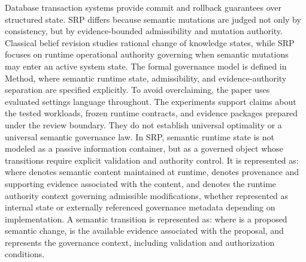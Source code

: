 {}Database transaction systems provide commit and rollback guarantees over structured state. SRP differs because semantic mutations are judged not only by consistency, but by evidence-bounded admissibility and mutation authority. Classical belief revision studies rational change of knowledge states, while SRP focuses on runtime operational authority governing when semantic mutations may enter an active system state.\markdownRendererParagraphSeparator
{}The formal governance model is defined in Method, where semantic runtime state, admissibility, and evidence-authority separation are specified explicitly.\markdownRendererInterblockSeparator
{}
\markdownRendererSectionEnd \markdownRendererSectionBegin
{}\markdownRendererInterblockSeparator
{}To avoid overclaiming, the paper uses evaluated settings language throughout. The experiments support claims about the tested workloads, frozen runtime contracts, and evidence packages prepared under the review boundary. They do not establish universal optimality or a universal semantic governance law.\markdownRendererInterblockSeparator
{}
\markdownRendererSectionEnd 
\markdownRendererSectionEnd \markdownRendererSectionBegin
{}\markdownRendererInterblockSeparator
{}\markdownRendererSectionBegin
{}\markdownRendererInterblockSeparator
{}In SRP, semantic runtime state is not modeled as a passive information container, but as a governed object whose transitions require explicit validation and authority control. It is represented as:\markdownRendererInterblockSeparator
{}\markdownRendererInterblockSeparator
{}where  denotes semantic content maintained at runtime,  denotes provenance and supporting evidence associated with the content, and  denotes the runtime authority context governing admissible modifications, whether represented as internal state or externally referenced governance metadata depending on implementation.\markdownRendererParagraphSeparator
{}A semantic transition is represented as:\markdownRendererInterblockSeparator
{}\markdownRendererInterblockSeparator
{}where  is a proposed semantic change,  is the available evidence associated with the proposal, and  represents the governance context, including validation and authorization conditions.\markdownRendererParagraphSeparator
